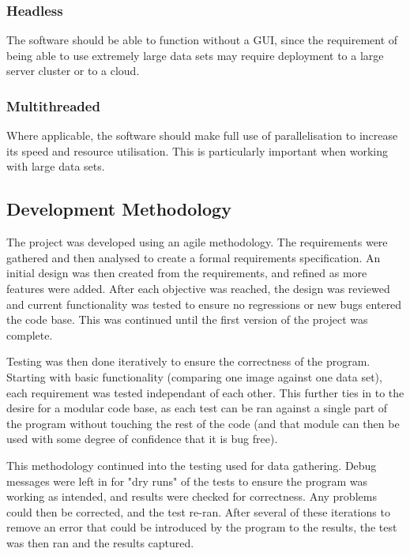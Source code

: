 \documentclass[12pt]{article}
\begin{document}
\subsubsection{Headless}
The software should be able to function without a GUI, since the requirement of being able to use extremely large data sets may require deployment to a large server cluster or to a cloud.

\subsubsection{Multithreaded}
Where applicable, the software should make full use of parallelisation to increase its speed and resource utilisation. This is particularly important when working with large data sets.

\subsection{Development Methodology}
The project was developed using an agile methodology. The requirements were gathered and then analysed to create a formal requirements specification. An initial design was then created from the requirements, and refined as more features were added. After each objective was reached, the design was reviewed and current functionality was tested to ensure no regressions or new bugs entered the code base. This was continued until the first version of the project was complete.

Testing was then done iteratively to ensure the correctness of the program. Starting with basic functionality (comparing one image against one data set), each requirement was tested independant of each other. This further ties in to the desire for a modular code base, as each test can be ran against a single part of the program without touching the rest of the code (and that module can then be used with some degree of confidence that it is bug free).

This methodology continued into the testing used for data gathering. Debug messages were left in for "dry runs" of the tests to ensure the program was working as intended, and results were checked for correctness. Any problems could then be corrected, and the test re-ran. After several of these iterations to remove an error that could be introduced by the program to the results, the test was then ran and the results captured.
\end{document}
